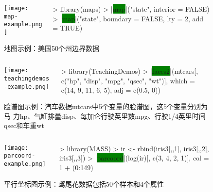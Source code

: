 \begin{frame}[c,fragile]{\subsecname}{}
\begin{figure}
 \begin{columns}
    \begin{column}[c]{.5\textwidth}
        \texttt{[image: map-example.png]}
    \end{column}

    \begin{column}[c]{.5\textwidth}
\begin{rcode}
> library(maps)
> |\colorbox{green}{map}|("state", interior = FALSE)
> |\colorbox{green}{map}|("state", boundary = FALSE, lty = 2, add = TRUE)
\end{rcode}
    \end{column}
  \end{columns}
  \caption{地图示例：美国50个州边界数据}
\end{figure}
\end{frame}

\begin{frame}[c,fragile]{\subsecname}{}
\begin{figure}
 \begin{columns}
    \begin{column}[c]{.5\textwidth}
        \texttt{[image: teachingdemos-example.png]}
    \end{column}

    \begin{column}[c]{.5\textwidth}
\begin{rcode}
> library(TeachingDemos)
> |\colorbox{green}{faces2}|(mtcars[, c("hp", "disp", "mpg", "qsec", "wt")], which = c(14, 9, 11, 6, 5), adj = c(0.5, 0))
\end{rcode}
    \end{column}
  \end{columns}
  \caption{脸谱图示例：汽车数据mtcars中5个变量的脸谱图，这5个变量分别为马
力hp、气缸排量disp、每加仑行驶英里数mpg、行驶1/4英里时间qsec和车重wt}
\end{figure}
\end{frame}

\begin{frame}[c,fragile]{\subsecname}{}
\begin{figure}
 \begin{columns}
    \begin{column}[c]{.5\textwidth}
        \texttt{[image: parcoord-example.png]}
    \end{column}

    \begin{column}[c]{.5\textwidth}
\begin{rcode}
> library(MASS)
> ir <- rbind(iris3[,,1], iris3[,,2], iris3[,,3])
> |\colorbox{green}{parcoord}|(log(ir)[, c(3, 4, 2, 1)], col = 1 + (0:149)%
\end{rcode}
    \end{column}
  \end{columns}
  \caption{平行坐标图示例：鸢尾花数据包括50个样本和4个属性}
\end{figure}
\end{frame}